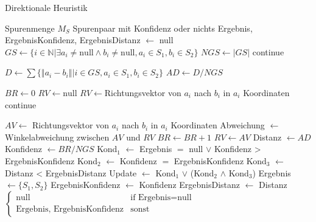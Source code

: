 \begin{algorithm}
  \caption{Direktionale Heuristik}
  \small
  \label{algo:heuristik-direktional}
  \begin{algorithmic}[1]
    \Require Spurenmenge $M_S$\;
    \Ensure Spurenpaar mit Konfidenz oder nichts\;
    \State Ergebnis, ErgebnisKonfidenz, ErgebnisDistanz $\gets$ null\;
        \State $GS \gets \{ i \in \mathbb{N} | \exists a_i \neq \text{null} \wedge b_i \neq \text{null}, a_i \in S_1, b_i \in S_2 \} $\;
        \State $NGS \gets \left| GS \right| $\;
            \State continue\;
        \EndIf

        \State $D \gets \sum \{\left\Vert a_i - b_i \right\Vert | i \in GS, a_i \in S_1, b_i \in S_2\}$\;
        \State $AD \gets D / NGS $\;

        \State $BR \gets 0$\; 
        \State $RV \gets \text{null}$\; 
         
                \State $RV \gets $Richtungsvektor von $a_i$ nach $b_i$ in $a_i$ Koordinaten\;
                \State continue\;
            \EndIf
 
            \State $AV \gets$ Richtungsvektor von $a_i$ nach $b_i$ in $a_i$ Koordinaten\;
            \State Abweichung $\gets$ Winkelabweichung zwischen $AV$ und $RV$\;
                \State $BR \gets BR + 1$\;
                \State $RV \gets AV$\;
            \EndIf
        \EndFor
            \State Distanz $\gets AD$\;
            \State Konfidenz $\gets BR / NGS$\;
            \State Kond$_1$ $\gets$ Ergebnis $=$ null $\vee$ Konfidenz > ErgebnisKonfidenz\;
            \State Kond$_2$ $\gets$ Konfidenz $=$ ErgebnisKonfidenz\;
            \State Kond$_3$ $\gets$ Distanz < ErgebnisDistanz\;
            \State Update $\gets$ Kond$_1$ $\vee$ (Kond$_2$ $\wedge$ Kond$_3$)\;
                \State Ergebnis $\gets \{S_1, S_2\}$\;
                \State ErgebnisKonfidenz $\gets$ Konfidenz\;
                \State ErgebnisDistanz $\gets$ Distanz\;
            \EndIf
        \EndIf
    \EndFor
    \State \Return $\begin{cases}
    \text{null} & \text{if Ergebnis} = \text{null}\\
    \text{Ergebnis, ErgebnisKonfidenz} & \text{sonst}
    \end{cases}$\;
  \end{algorithmic}
\end{algorithm}

